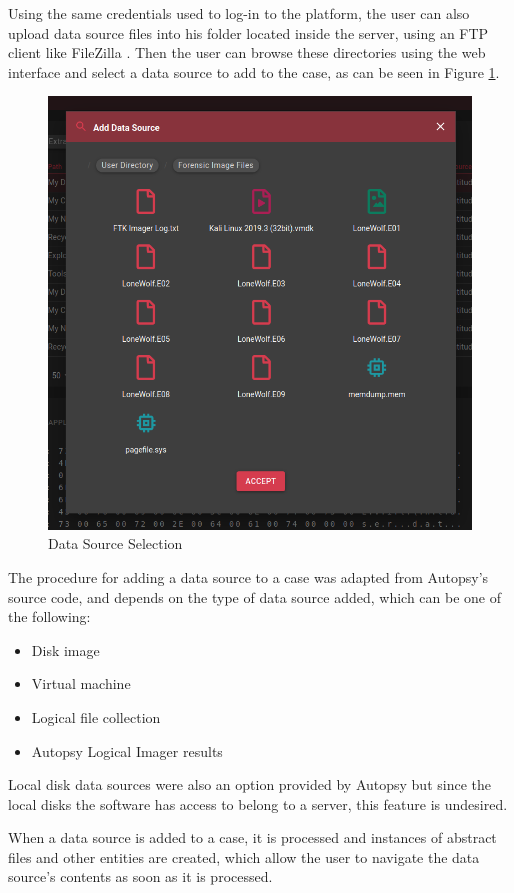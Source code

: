 Using the same credentials used to log-in to the platform, the user can also upload data source files into his folder located inside the server, using an FTP client like FileZilla \cite{filezilla}.
Then the user can browse these directories using the web interface and select a data source to add to the case, as can be seen in Figure \ref{fig:datasource}.

\begin{figure}[ht]
 \centering
 \includegraphics[width=0.75\linewidth]{imgs/data-sources.png}
 \caption{Data Source Selection}
 \label{fig:datasource}
\end{figure}

The procedure for adding a data source to a case was adapted from Autopsy's source code, and depends on the type of data source added, which can be one of the following:
\begin{itemize}
 \item Disk image
 \item Virtual machine
 \item Logical file collection
 \item Autopsy Logical Imager \cite{imager} results
\end{itemize}

Local disk data sources were also an option provided by Autopsy but since the local disks the software has access to belong to a server, this feature is undesired.

When a data source is added to a case, it is processed and instances of abstract files and other entities are created, which allow the user to navigate the data source's contents as soon as it is processed.

